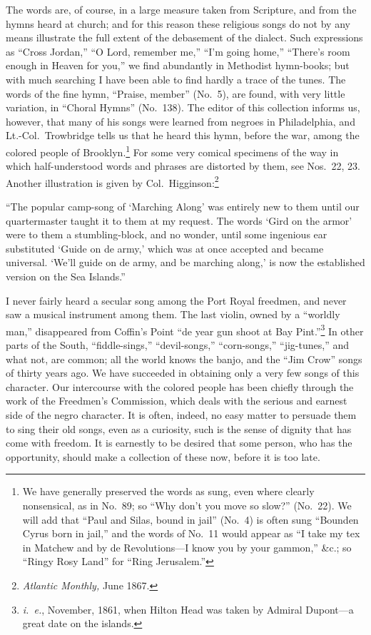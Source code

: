 \documentclass[a5paper,10pt]{book}
\begin{document}
The words are, of course, in a large measure taken from Scripture, and
from the hymns heard at church; and for this reason these religious
songs do not by any means illustrate the full extent of the debasement
of the dialect.  Such expressions as ``Cross Jordan,'' ``O Lord,
remember me,'' ``I'm going home,'' ``There's room enough in Heaven for
you,'' we find abundantly in Methodist hymn-books; but with much
searching I have been able to find hardly a trace of the tunes.  The
words of the fine hymn, ``Praise, member'' (No.~5), are found, with
very little variation, in ``Choral Hymns'' (No.~138).  The editor of
this collection informs us, however, that many of his songs were
learned from negroes in Philadelphia, and Lt.-Col.~Trowbridge tells us
that he heard this hymn, before the war, among the colored people of
Brooklyn.\footnote{We have generally preserved the words as sung, even
where clearly nonsensical, as in No.~89; so ``Why don't you move so
slow?'' (No.~22).  We will add that ``Paul and Silas, bound in jail''
(No.~4) is often sung ``Bounden Cyrus born in jail,'' and the words of
No.~11 would appear as ``I take my tex in Matchew and by de
Revolutions---I know you by your gammon,'' \&c.; so ``Ringy Rosy Land''
for ``Ring Jerusalem.''}  For some very comical specimens of the way
in which half-understood words and phrases are distorted by them, see
Nos.~22, 23.  Another illustration is given by
Col.~Higginson:\footnote{\emph{Atlantic Monthly,} June 1867.}

``The popular camp-song of `Marching Along' was entirely new to them
until our quartermaster taught it to them at my request.  The words
`Gird on the armor' were to them a stumbling-block, and no wonder,
until some ingenious ear substituted `Guide on de army,' which was at
once accepted and became universal.  `We'll guide on de army, and be
marching along,' is now the established version on the Sea Islands.''

I never fairly heard a secular song among the Port Royal freedmen, and
never saw a musical instrument among them.  The last violin, owned by
a ``worldly man,'' disappeared from Coffin's Point ``de year gun shoot
at Bay Pint.''\footnote{\emph{i.~e.}, November, 1861, when Hilton Head
was taken by Admiral Dupont---a great date on the islands.}  In other
parts of the South, ``fiddle-sings,'' ``devil-songs,'' ``corn-songs,''
``jig-tunes,'' and what not, are common; all the world knows the
banjo, and the ``Jim Crow'' songs of thirty years ago.  We have
succeeded in obtaining only a very few songs of this character.  Our
intercourse with the colored people has been chiefly through the work
of the Freedmen's Commission, which deals with the serious and earnest
side of the negro character.  It is often, indeed, no easy matter to
persuade them to sing their old songs, even as a curiosity, such is
the sense of dignity that has come with freedom.  It is earnestly to
be desired that some person, who has the opportunity, should make a
collection of these now, before it is too late.
\end{document}
